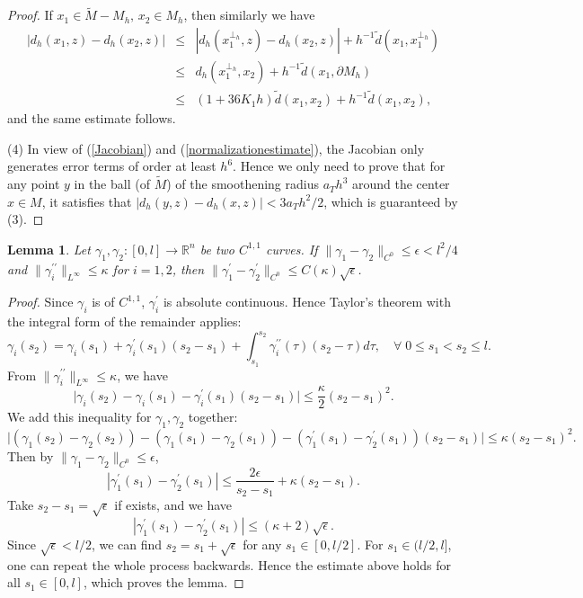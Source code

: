 \documentclass[11pt,letterpaper]{amsart}
\numberwithin{equation}{section}
\theoremstyle{definition}
\theoremstyle{plain}
\theoremstyle{definition}
\theoremstyle{plain}
\theoremstyle{definition}
\theoremstyle{plain}
\newtheorem{closeness-curve}[riccati]{Lemma}
\begin{document}
\begin{proof}
If $x_1\in \widetilde{M}-M_h,\,x_2\in M_h$, then similarly we have
\begin{eqnarray*}
|d_h(x_1,z)-d_h(x_2,z)|&\leqslant& |d_h(x_1^{\perp_h},z)-d_h(x_2,z)|+ h^{-1}\widetilde{d}(x_1,x_1^{\perp_h}) \\
&\leqslant& d_h(x_1^{\perp_h},x_2) + h^{-1}\widetilde{d}(x_1,\partial M_h) \\
&\leqslant& (1+36K_1h)\widetilde{d}(x_1,x_2) +h^{-1}\widetilde{d}(x_1,x_2),
\end{eqnarray*}
and the same estimate follows.

\smallskip
\noindent (4) In view of (\ref{Jacobian}) and (\ref{normalizationestimate}), the Jacobian only generates error terms of order at least $h^6$. Hence we only need to prove that for any point $y$ in the ball (of $\widetilde{M}$) of the smoothening radius $a_T h^3$ around the center $x\in M$, it satisfies that $|d_h(y,z)-d_h(x,z)|<3a_T h^2/2$, which is guaranteed by (3). 
\end{proof}

\begin{closeness-curve}\label{closeness-curve}
Let $\gamma_1,\gamma_2: [0,l]\to \mathbb{R}^n$ be two $C^{1,1}$ curves. If $\|\gamma_1-\gamma_2\|_{C^0}\leqslant \epsilon<l^2/4$ and $\|\gamma_i^{\prime\prime}\|_{L^{\infty}}\leqslant \kappa$ for $i=1,2$, then $\|\gamma_1^{\prime}-\gamma_2^{\prime}\|_{C^0}\leqslant C(\kappa)\sqrt{\epsilon}$.
\end{closeness-curve}

\begin{proof}
Since $\gamma_i$ is of $C^{1,1}$, $\gamma_i^{\prime}$ is absolute continuous. Hence Taylor's theorem with the integral form of the remainder applies:
$$\gamma_i (s_2)=\gamma_i (s_1)+\gamma_i^{\prime}(s_1)(s_2-s_1)+\int_{s_1}^{s_2} \gamma_i^{\prime\prime}(\tau)(s_2-\tau)d\tau, \quad \forall \; 0\leqslant s_1<s_2\leqslant l.$$
From $\|\gamma_i^{\prime\prime}\|_{L^{\infty}}\leqslant \kappa$, we have
$$\big|\gamma_i (s_2)-\gamma_i (s_1)-\gamma_i^{\prime}(s_1)(s_2-s_1) \big|\leqslant \frac{\kappa}{2}(s_2-s_1)^2.$$
We add this inequality for $\gamma_1,\gamma_2$ together:
$$\big|(\gamma_1 (s_2)-\gamma_2 (s_2))-(\gamma_1 (s_1)-\gamma_2 (s_1))-(\gamma_1^{\prime}(s_1)-\gamma_2^{\prime}(s_1))(s_2-s_1) \big|\leqslant \kappa(s_2-s_1)^2.$$
Then by $\|\gamma_1-\gamma_2\|_{C^0}\leqslant \epsilon$,
$$|\gamma_1^{\prime}(s_1)-\gamma_2^{\prime}(s_1)|\leqslant \frac{2\epsilon}{s_2-s_1}+\kappa (s_2-s_1).$$
Take $s_2-s_1=\sqrt{\epsilon}$ if exists, and we have
$$|\gamma_1^{\prime}(s_1)-\gamma_2^{\prime}(s_1)|\leqslant (\kappa+2)\sqrt{\epsilon}.$$
Since $\sqrt{\epsilon}<l/2$, we can find $s_2=s_1+\sqrt{\epsilon}$ for any $s_1\in [0,l/2]$. For $s_1\in (l/2,l]$, one can repeat the whole process backwards. Hence the estimate above holds for all $s_1\in[0,l]$, which proves the lemma.
\end{proof}
\end{document}
